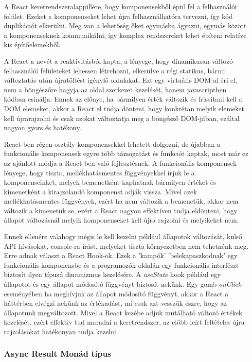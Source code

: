 A React keretrendszeralappillére, hogy komponensekből épül fel a felhasználói felület. Ezeket a komponenseket lehet újra felhasználhatóra tervezni, így kód duplikációt elkerülni. Meg van a lehetőség őket egymásba ágyazni, egymás között a komponenseknek kommunikálni, így komplex rendszereket lehet építeni relatíve kis építőelemekből.

A React a nevét a reaktivitásból kapta, a lényege, hogy dinamikusan változó felhasználói felületeket lehessen létrehozni, elkerülve a régi statikus, bármi változtatás után újratöltést igénylő oldalakat. Ezt egy virtuális DOM-al éri el, nem a böngészőre hagyja az oldal szerkezet kezelését, hanem javascriptben kódban csinálja. Ennek az előnye, ha bármilyen érték változik és frissítani kell a DOM elemeket, akkor a React el tudja dönteni, hogy konkrétan melyik elemeket kell újrarajzolni és csak azokat változtatja meg a böngésző DOM-jában, ezáltal nagyon gyors és hatékony.

React-ben régen osztály komponensekkel lehetett dolgozni, de újabban a funkcionális komponensek egyre több támogatást és funkciót kaptak, most már ez az ajánlott módja a React-ben való fejlesztésnek. A funkcionális komponensek lényege, hogy tiszta, mellékhatásmentes függvényekkel írjuk le a komponenseinket, melyek bemenetként kaphatnak bármilyen értéket és kimenetként a kirajzolandó komponenst adják vissza. Mivel azek mellékhatásmentes függvények, ezért ha nem változik a bemenetük, akkor nem változik a kimenetük se, ezért a React nagyon effektíven tudja eldönteni, hogy állapot változásnál melyik komponenseket kell újra rajzolni és melyikeket nem.

Ennek ellenére valahogy mégis le kell kezelni például állapotok változását, külső API hívásokat, console-ra írást, melyeket tiszta környezetben nem tehetnénk meg. Erre adnak választ a React Hook-ok. Ezek a 'kampók' 'belekapaszkodnak' egy funkcionális komponensbe és a programozók oldalán egy funkcionális interfészt biztosít ilyen típusú dinamizmus kezelésére. A \textit{useState} hook például egy állapotot és egy állapot módosító függvényt biztosít nekünk. Egy gomb \textit{onClick} eseményében ha meghívjuk az állapot módosító függvényt, akkor a React a háttérben elvégzi nekünk az értékadást, mi csak azt vesszük észre, hogy az állapotunk megváltozott. Mivel a React kezébe adjuk mutálható változó értékek kezelését, ezért effektív tud maradni a keretrendszer, az előbb leírt feltételes újra rajzolásokat hatékonyan tudja kezelni.

\subsubsection{Async Result Monád típus}

